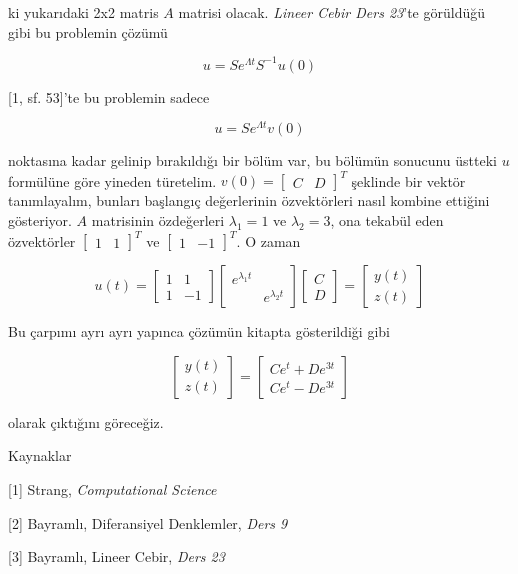 \documentclass[12pt,fleqn]{article}\usepackage{../../common}
\begin{document}
ki yukarıdaki 2x2 matris $A$ matrisi olacak. {\em Lineer Cebir Ders 23}'te
görüldüğü gibi bu problemin çözümü 

$$ u = S e^{\Lambda t} S^{-1} u(0) $$

[1, sf. 53]'te bu problemin sadece 

$$ u = S e^{\Lambda t} v(0) $$

noktasına kadar gelinip bırakıldığı bir bölüm var, bu bölümün sonucunu üstteki
$u$ formülüne göre yineden türetelim. $v(0) = \left[\begin{array}{cc} C &
    D \end{array}\right]^T$ şeklinde bir vektör tanımlayalım, bunları başlangıç
değerlerinin özvektörleri nasıl kombine ettiğini gösteriyor. $A$ matrisinin
özdeğerleri $\lambda_1=1$ ve $\lambda_2=3$, ona tekabül eden özvektörler
$\left[\begin{array}{cc} 1 & 1 \end{array}\right]^T$ ve $\left[\begin{array}{cc}
    1 & -1 \end{array}\right]^T$. O zaman

$$ 
u(t) =
\left[\begin{array}{rr}
1 & 1 \\
1 & -1
\end{array}\right]
\left[\begin{array}{rr}
e^{\lambda_1 t} & \\
& e^{\lambda_2 t} 
\end{array}\right]
\left[\begin{array}{r}
C \\
D
\end{array}\right]
= 
\left[\begin{array}{r}
y(t) \\
z(t)
\end{array}\right]
 $$

Bu çarpımı ayrı ayrı yapınca çözümün kitapta gösterildiği gibi

$$        
\left[\begin{array}{r}
y(t) \\
z(t)
\end{array}\right]
=
\left[\begin{array}{r}
Ce^t + De^{3t} \\
Ce^t - De^{3t} 
\end{array}\right]
$$

olarak çıktığını göreceğiz. 

Kaynaklar 

[1] Strang, {\em Computational Science}

[2] Bayramlı, Diferansiyel Denklemler, {\em Ders 9}

[3] Bayramlı, Lineer Cebir, {\em Ders 23}
\end{document}
